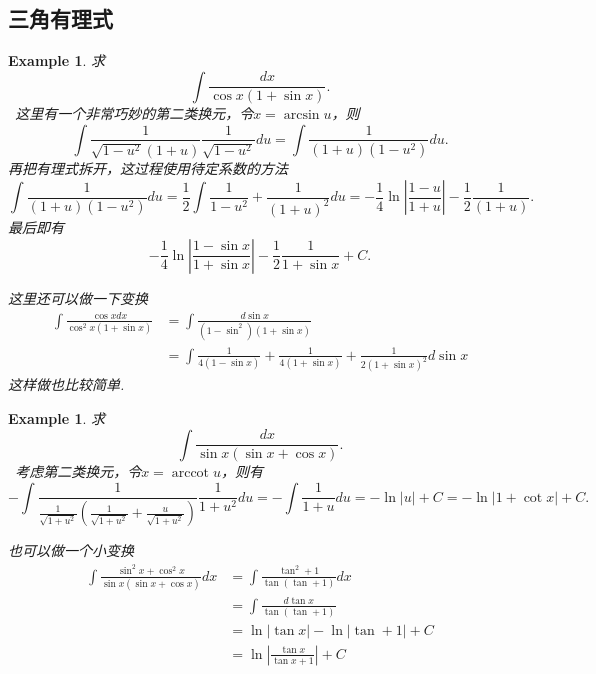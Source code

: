 \documentclass{article}
\newtheorem{example}[theorem]{Example}
\newcommand{\hints}{{\color{blue} \text{hints}}}
\DeclareMathOperator{\arccot}{arccot}
\begin{document}
\subsection{三角有理式}

\begin{example}
\rm 求
$$
\int \frac{dx}{\cos x(1+\sin x)}.
$$
\hints\ 这里有一个非常巧妙的第二类换元，令$x=\arcsin u$，则
$$
\int \frac{1}{\sqrt{1-u^2}(1+u)} \frac{1}{\sqrt{1-u^2}}du = \int \frac{1}{(1+u)(1-u^2)}du .
$$
再把有理式拆开，这过程使用待定系数的方法
$$
\int \frac{1}{(1+u)(1-u^2)}du = \frac{1}{2}\int \frac{1}{1-u^2} + \frac{1}{(1+u)^2}du  = -\frac{1}{4} \ln \left| \frac{1-u}{1+u} \right| -\frac{1}{2}\frac{1}{(1+u)}. 
$$
最后即有
$$
-\frac{1}{4} \ln \left|\frac{1-\sin x}{1+\sin x}\right| - \frac{1}{2}\frac{1}{1+\sin x}+C. 
$$

这里还可以做一下变换
$$
\begin{aligned}
\int \frac{\cos x dx}{\cos^2x(1+\sin x)} &= \int \frac{d\sin x}{(1-\sin^2)(1+\sin x)}  \\
&= \int \frac{1}{4(1-\sin x)} + \frac{1}{4(1+\sin x)} + \frac{1}{2(1+\sin x)^2}d\sin x
\end{aligned}
$$
这样做也比较简单.
\end{example}

\begin{example}
\rm 求
$$
\int \frac{dx}{\sin x(\sin x + \cos x)}.
$$
\hints\ 考虑第二类换元，令$x = \arccot u$，则有
$$
- \int \frac{1}{\frac{1}{\sqrt{1+u^2}}(\frac{1}{\sqrt{1+u^2}} + \frac{u}{\sqrt{1+u^2}})} \frac{1}{1+u^2} du = - \int \frac{1}{1+u}du = - \ln |u| + C = -\ln|1+\cot x| + C .
$$

也可以做一个小变换
$$
\begin{aligned}
\int \frac{\sin^2x + \cos^2 x}{\sin x(\sin x + \cos x)} dx &= \int \frac{\tan^2 + 1}{\tan(\tan + 1)}dx \\
&= \int \frac{d\tan x}{\tan(\tan + 1)} \\
&= \ln |\tan x| - \ln |\tan+1| + C \\
&= \ln \left| \frac{\tan x}{\tan x + 1}\right| + C
\end{aligned}
$$
\end{example}
\end{document}
